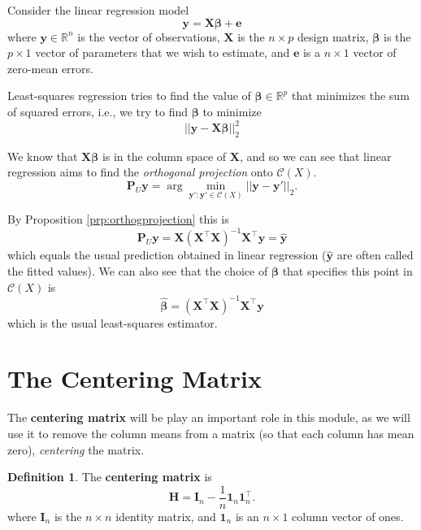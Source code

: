 \documentclass[
]{book}
\theoremstyle{definition}
\newtheorem{definition}{Definition}[chapter]
\theoremstyle{definition}
\theoremstyle{definition}
\theoremstyle{definition}
\theoremstyle{remark}
\begin{document}
Consider the linear regression model
\[\mathbf y= \mathbf X\boldsymbol \beta+\mathbf e\]
where \(\mathbf y\in\mathbb{R}^n\) is the vector of observations, \(\mathbf X\) is the \(n\times p\) design matrix, \(\boldsymbol \beta\) is the \(p\times 1\) vector of parameters that we wish to estimate, and \(\mathbf e\) is a \(n\times 1\) vector of zero-mean errors.

Least-squares regression tries to find the value of \(\boldsymbol \beta\in \mathbb{R}^p\) that minimizes the sum of squared errors, i.e., we try to find \(\boldsymbol \beta\) to minimize
\[||\mathbf y- \mathbf X\boldsymbol \beta||_2^2\]

We know that \(\mathbf X\boldsymbol \beta\) is in the column space of \(\mathbf X\), and so we can see that linear regression aims to find the \emph{orthogonal projection} onto \(\mathcal{C}(X)\).
\[\mathbf P_U\mathbf y=\arg \min_{\mathbf y': \mathbf y' \in \mathcal{C}(X)} ||\mathbf y-\mathbf y'||_2.\]

By Proposition \ref{prp:orthogprojection} this is
\[\mathbf P_U\mathbf y= \mathbf X(\mathbf X^\top \mathbf X)^{-1}\mathbf X^\top \mathbf y=\hat{\mathbf y}\]
which equals the usual prediction obtained in linear regression (\(\hat{\mathbf y}\) are often called the fitted values). We can also see that the choice of \(\boldsymbol \beta\) that specifies this point in \(\mathcal{C}(X)\) is
\[\hat{\boldsymbol \beta}=(\mathbf X^\top \mathbf X)^{-1}\mathbf X^\top \mathbf y\]
which is the usual least-squares estimator.

\hypertarget{centering-matrix}{%
\section{The Centering Matrix}\label{centering-matrix}}

The \textbf{centering matrix} will be play an important role in this module, as we will use it to remove the column means from a matrix (so that each column has mean zero), \emph{centering} the matrix.

\begin{definition}
\protect\hypertarget{def:centeringmatrix}{}\label{def:centeringmatrix}The \textbf{centering matrix} is
\begin{equation}
\mathbf H=\mathbf I_n - \frac{1}{n} {\mathbf 1}_n {\mathbf 1}_n^\top.
\label{eq:Hcentre}
\end{equation}
where \(\mathbf I_n\) is the \(n \times n\) identity matrix, and \({\mathbf 1}_n\) is an \(n \times 1\) column vector of ones.
\end{definition}
\end{document}
